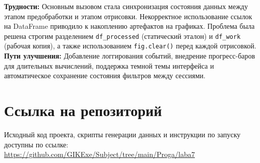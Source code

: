 \documentclass[oneside,a4paper,14pt]{extarticle} %
\begin{document}
\textbf{Трудности:} Основным вызовом стала синхронизация состояния данных между этапом предобработки и этапом отрисовки. Некорректное использование ссылок на DataFrame приводило к накоплению артефактов на графиках. Проблема была решена строгим разделением \texttt{df\_processed} (статический эталон) и \texttt{df\_work} (рабочая копия), а также использованием \texttt{fig.clear()} перед каждой отрисовкой.\\
\textbf{Пути улучшения:} Добавление логгирования событий, внедрение прогресс-баров для длительных вычислений, поддержка темной темы интерфейса и автоматическое сохранение состояния фильтров между сессиями.

\section{Ссылка на репозиторий}
Исходный код проекта, скрипты генерации данных и инструкции по запуску доступны по ссылке:\\
\url{https://github.com/GIKExe/Subject/tree/main/Proga/laba7}
\end{document}

